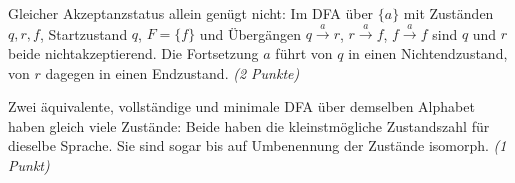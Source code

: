 \documentclass[11pt,a4paper]{article}
\begin{document}
Gleicher Akzeptanzstatus allein genügt nicht: Im DFA über $\{a\}$ mit
Zuständen $q,r,f$, Startzustand $q$, $F=\{f\}$ und Übergängen
$q\xrightarrow{a}r$, $r\xrightarrow{a}f$, $f\xrightarrow{a}f$
sind $q$ und $r$ beide nichtakzeptierend. Die Fortsetzung $a$ führt von
$q$ in einen Nichtendzustand, von $r$ dagegen in einen Endzustand.
\textit{(2 Punkte)}

Zwei äquivalente, vollständige und minimale DFA über demselben Alphabet
haben gleich viele Zustände: Beide haben die kleinstmögliche Zustandszahl
für dieselbe Sprache. Sie sind sogar bis auf Umbenennung der Zustände
isomorph. \textit{(1 Punkt)}
\endgroup
\fi
\end{document}
